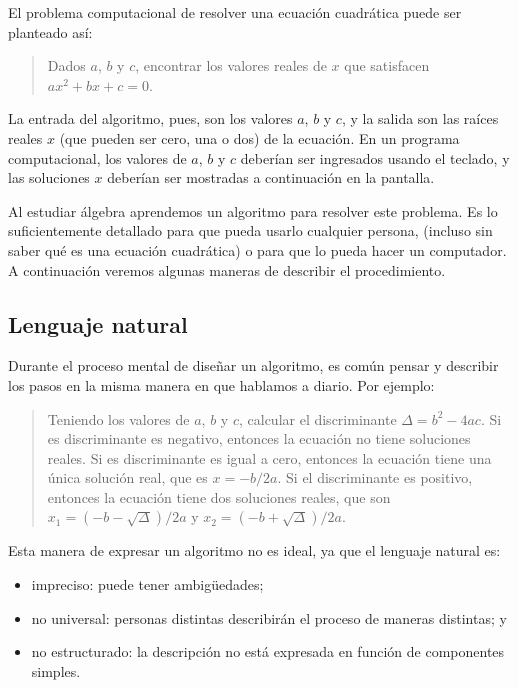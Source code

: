 El problema computacional de resolver una ecuación cuadrática puede ser
planteado así:

\begin{quote}
Dados \(a\), \(b\) y \(c\), encontrar los valores reales de \(x\) que satisfacen
\(ax^2 + bx + c = 0\).
\end{quote}

La entrada del algoritmo, pues, son los valores \(a\), \(b\) y \(c\), y la
salida son las raíces reales \(x\) (que pueden ser cero, una o dos) de la
ecuación. En un programa computacional, los valores de \(a\), \(b\) y \(c\)
deberían ser ingresados usando el teclado, y las soluciones \(x\) deberían
ser mostradas a continuación en la pantalla.

Al estudiar álgebra aprendemos un algoritmo para resolver este problema.
Es lo suficientemente detallado para que pueda usarlo cualquier persona,
(incluso sin saber qué es una ecuación cuadrática) o para que lo pueda
hacer un computador. A continuación veremos algunas maneras de describir
el procedimiento.

\subsection{Lenguaje natural}

Durante el proceso mental de diseñar un algoritmo, es común pensar y
describir los pasos en la misma manera en que hablamos a diario. Por
ejemplo:

\begin{quote}
Teniendo los valores de \(a\), \(b\) y \(c\), calcular el discriminante
\(\Delta = b^2 - 4ac\). Si es discriminante es negativo, entonces la ecuación no
tiene soluciones reales. Si es discriminante es igual a cero, entonces
la ecuación tiene una única solución real, que es \(x = -b/2a\). Si el
discriminante es positivo, entonces la ecuación tiene dos soluciones
reales, que son \(x_1 = (-b - \sqrt{\Delta})/2a\) y \(x_2 = (-b + \sqrt{\Delta})/2a\).
\end{quote}

Esta manera de expresar un algoritmo no es ideal, ya que el lenguaje
natural es:

\begin{itemize}
\item
  impreciso: puede tener ambigüedades;
\item
  no universal: personas distintas describirán el proceso de maneras
  distintas; y
\item
  no estructurado: la descripción no está expresada en función de
  componentes simples.
\end{itemize}

